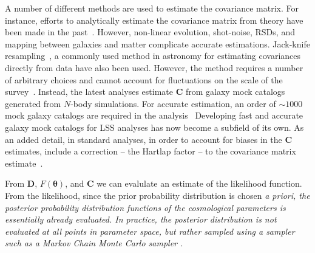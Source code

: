 A number of different methods are used to estimate the covariance matrix. For instance, 
efforts to analytically estimate the covariance matrix from theory have been made in 
the past~\citep{Hamilton:2006aa, Pope:2008aa, dePutter:2012aa}. However, 
non-linear evolution, shot-noise, RSDs, and mapping between galaxies and matter
complicate accurate estimations. Jack-knife resampling~\citep{Shao:1995aa}, 
a commonly used method in astronomy for estimating covariances directly from data 
have also been used. However, the method requires a number of arbitrary choices 
and cannot account for fluctuations on the scale of the survey~\citep{Norberg:2009aa}.
Instead, the latest analyses estimate $\bm{C}$ from galaxy mock catalogs generated 
from $N$-body simulations. For accurate estimation, an order of $\sim 1000$ mock
galaxy catalogs are required in the analysis~\citep{Scoccimarro:2002aa, McBridge:2011aa, 
Anderson:2012aa, Manera:2013aa, Rodriguez-Torres:2015aa, Kitaura:2016aa, Beutler:2016aa}
Developing fast and accurate galaxy mock catalogs for LSS analyses has now become a 
subfield of its own. As an added detail, in standard analyses, in order to 
account for biases in the $\bm{C}$ estimates, include a correction -- the Hartlap factor -- 
to the covariance matrix estimate~\citep{hartlap2007}.

From $\bm{D}$, $F(\bm{\theta})$, and $\bm{C}$ we can evalulate an estimate of the 
likelihood function. From the likelihood,
since the prior probability distribution is chosen \em{a priori}, the posterior 
probability distribution functions of the cosmological parameters is essentially already 
evaluated. In practice, the posterior distribution is not evaluated at all points in 
parameter space, but rather sampled using a sampler such as a Markov Chain Monte 
Carlo sampler \citep[\emph{e.g.} $\mathtt{emcee}$][]{emcee}.

